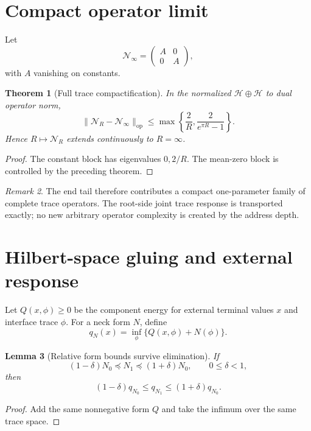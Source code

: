 \documentclass[10pt]{article}
\newtheorem{theorem}{Theorem}[section]
\newtheorem{lemma}[theorem]{Lemma}
\theoremstyle{definition}
\theoremstyle{remark}
\newtheorem{remark}[theorem]{Remark}
\newcommand{\op}{\mathrm{op}}
\begin{document}
\section{Compact operator limit}

Let
\[
 \mathcal N_\infty=
 \begin{pmatrix}A&0\\0&A\end{pmatrix},
\tag{6.1}
\]
with $A$ vanishing on constants.

\begin{theorem}[Full trace compactification]
In the normalized $\mathcal H\oplus\mathcal H$ to dual operator norm,
\[
 \|\mathcal N_R-\mathcal N_\infty\|_{\op}
 \le
 \max\left\{\frac2R,\frac{2}{e^{\pi R}-1}\right\}.
\tag{6.2}
\]
Hence $R\mapsto\mathcal N_R$ extends continuously to $R=\infty$.
\end{theorem}

\begin{proof}
The constant block has eigenvalues $0,2/R$. The mean-zero block is controlled
by the preceding theorem.
\end{proof}

\begin{remark}
The end tail therefore contributes a compact one-parameter family of complete
trace operators. The root-side joint trace response is transported exactly;
no new arbitrary operator complexity is created by the address depth.
\end{remark}

\section{Hilbert-space gluing and external response}

Let $Q(x,\phi)\ge0$ be the component energy for external terminal values
$x$ and interface trace $\phi$. For a neck form $N$, define
\[
 q_N(x)=\inf_\phi\{Q(x,\phi)+N(\phi)\}.
\tag{7.1}
\]

\begin{lemma}[Relative form bounds survive elimination]
If
\[
 (1-\delta)N_0\preceq N_1\preceq(1+\delta)N_0,
 \qquad0\le\delta<1,
\]
then
\[
 (1-\delta)q_{N_0}\le q_{N_1}\le(1+\delta)q_{N_0}.
\tag{7.2}
\]
\end{lemma}

\begin{proof}
Add the same nonnegative form $Q$ and take the infimum over the same trace
space.
\end{proof}
\end{document}
